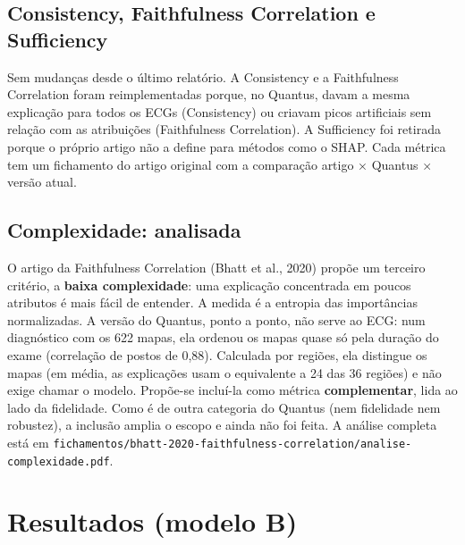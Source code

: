 \documentclass[11pt,a4paper]{article}
\begin{document}
\subsection{Consistency, Faithfulness Correlation e Sufficiency}
Sem mudanças desde o último relatório. A Consistency e a Faithfulness Correlation foram reimplementadas porque, no Quantus, davam a mesma explicação para todos os ECGs (Consistency) ou criavam picos artificiais sem relação com as atribuições (Faithfulness Correlation). A Sufficiency foi retirada porque o próprio artigo não a define para métodos como o SHAP. Cada métrica tem um fichamento do artigo original com a comparação artigo × Quantus × versão atual.

\subsection{Complexidade: analisada}
O artigo da Faithfulness Correlation (Bhatt et al., 2020) propõe um terceiro critério, a \textbf{baixa complexidade}: uma explicação concentrada em poucos atributos é mais fácil de entender. A medida é a entropia das importâncias normalizadas. A versão do Quantus, ponto a ponto, não serve ao ECG: num diagnóstico com os 622 mapas, ela ordenou os mapas quase só pela duração do exame (correlação de postos de 0,88). Calculada por regiões, ela distingue os mapas (em média, as explicações usam o equivalente a 24 das 36 regiões) e não exige chamar o modelo. Propõe-se incluí-la como métrica \textbf{complementar}, lida ao lado da fidelidade. Como é de outra categoria do Quantus (nem fidelidade nem robustez), a inclusão amplia o escopo e ainda não foi feita. A análise completa está em \texttt{fichamentos/bhatt-2020-faithfulness-correlation/analise-complexidade.pdf}.

\section{Resultados (modelo B)}
\end{document}
